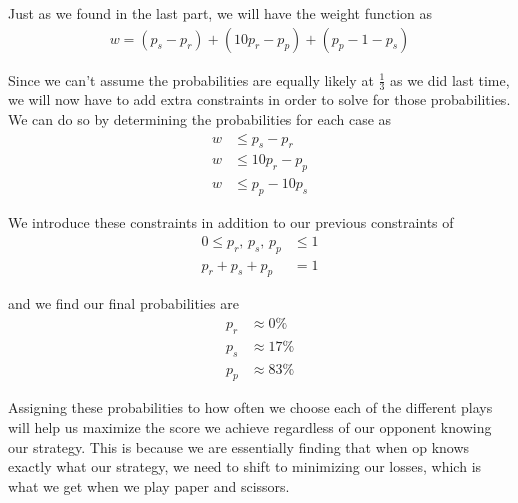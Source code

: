 \documentclass{article}
\begin{document}
\begin{enumerate}
\begin{enumerate}



Just as we found in the last part, we will have the weight function as 
\begin{align*}
    w = (p_s - p_r) + (10p_r - p_p) + (p_p - 1-p_s)
\end{align*}

Since we can't assume the probabilities are equally likely at $\frac{1}{3}$ as we did last time, we will now have to add extra constraints in order to solve for those probabilities. We can do so by determining the probabilities for each case as 
\begin{align*}
    w & \leq p_s - p_r \\
    w & \leq 10p_r - p_p \\
    w & \leq p_p - 10p_s
\end{align*}

We introduce these constraints in addition to our previous constraints of 
\begin{align*}
    0 \leq p_r \text{, } p_s \text{, } p_p & \leq 1 \\
    p_r + p_s + p_p & = 1
\end{align*}

and we find our final probabilities are 
\begin{align*}
    p_r & \approx 0\% \\
    p_s & \approx 17 \% \\
    p_p & \approx 83\%
\end{align*}

Assigning these probabilities to how often we choose each of the different plays will help us maximize the score we achieve regardless of our opponent knowing our strategy. This is because we are essentially finding that when op knows exactly what our strategy, we need to shift to minimizing our losses, which is what we get when we play paper and scissors. 




\end{enumerate}
\end{enumerate}
\end{document}
